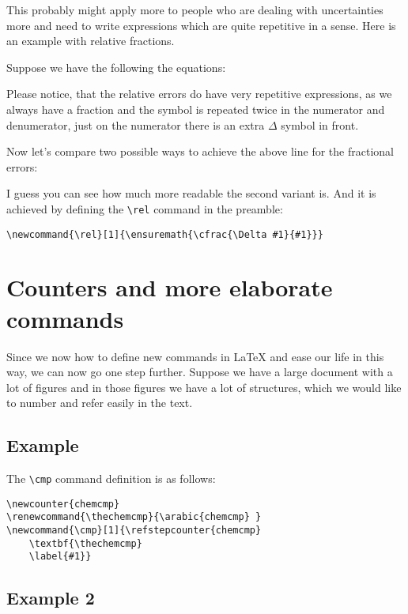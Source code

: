 This probably might apply more to people who are dealing with uncertainties more
and need to write expressions which are quite repetitive in a sense. Here is an
example with relative fractions.

Suppose we have the following the equations:


Please notice, that the relative errors do have very repetitive expressions,
as we always have a fraction and the symbol is repeated twice in the numerator
and denumerator, just on the numerator there is an extra $\Delta$ symbol in
front.

Now let's compare two possible ways to achieve the above line for the fractional
errors:



I guess you can see how much more readable the second variant is. And it is
achieved by defining the \verb|\rel| command in the preamble:
\begin{lstlisting}
\newcommand{\rel}[1]{\ensuremath{\cfrac{\Delta #1}{#1}}}
\end{lstlisting}


\section{Counters and more elaborate commands}

Since we now how to define new commands in \LaTeX{} and ease our life in this
way, we can now go one step further. Suppose we have a large document with a lot
of figures and in those figures we have a lot of structures, which we would like
to number and refer easily in the text. 

\subsection{Example}




The \verb|\cmp| command definition is as follows:
\begin{lstlisting}
\newcounter{chemcmp}
\renewcommand{\thechemcmp}{\arabic{chemcmp} }
\newcommand{\cmp}[1]{\refstepcounter{chemcmp}
    \textbf{\thechemcmp}
    \label{#1}}
\end{lstlisting}

\subsection{Example 2}

